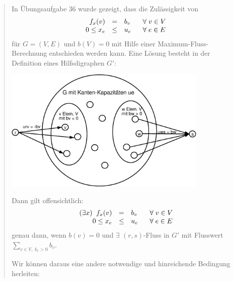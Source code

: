 \begin{quote}
In Übungsaufgabe 36 wurde gezeigt, dass die Zulässigkeit von
\[\begin{array}{rcl@{\hspace{6mm}}l}
f_x(v) &=& b_v& \forall \; v \in V\\
0 \leq x_e &\leq& u_e& \forall \; e \in E
\end{array}\]
für $G=(V,E)$ und $b(V)=0$ mit Hilfe einer Maximum-Fluss-Berechnung
entschieden werden kann. Eine Lösung besteht in der Definition eines
Hilfsdigraphen $G'$:

\includegraphics[height=6cm]{bilder/4-4Handout}

Dann gilt offensichtlich:
\[\begin{array}{rcl@{\hspace{6mm}}l}
(\exists x) \; \; f_x(v) &=& b_v &\forall \; v \in V\\
0 \leq x_e &\leq& u_e & \forall \; e \in E
\end{array}
\]
genau dann, wenn $b(v) = 0$ und $\exists$ $(r,s)$-Fluss in $G'$ mit
Flusswert $\displaystyle \sum_{v\in V,\; b_{v}>0} b_{v}$.

Wir können daraus eine andere notwendige und hinreichende Bedingung
herleiten:


\end{quote}
